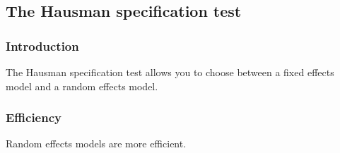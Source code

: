 
\subsection{The Hausman specification test}

\subsubsection{Introduction}

The Hausman specification test allows you to choose between a fixed effects model and a random effects model.

\subsubsection{Efficiency}

Random effects models are more efficient.

